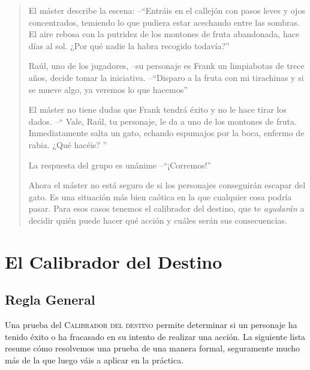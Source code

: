 \begin{quotation}

El máster describe la escena: --\enquote{Entráis en el callejón con pasos
 leves y ojos concentrados, temiendo lo que pudiera estar acechando entre 
 las sombras. El aire rebosa con la putridez de los montones de fruta abandonada, 
 hace días al sol. ¿Por qué nadie la habra recogido todavía?}

Raúl, uno de los jugadores, --su personaje es Frank un limpiabotas de trece años, 
decide tomar la iniciativa. --\enquote{Disparo a la fruta con mi tirachinas 
y si se mueve algo, ya veremos lo que hacemos}

El máster no tiene dudas que Frank tendrá éxito y no le hace tirar los dados. --\enquote{
Vale, Raúl, tu personaje, le da a uno de los montones de fruta. Inmediatamente
salta un gato, echando espumajos por la boca, enfermo de rabia. ¿Qué hacéis?
}

La respuesta del grupo es unánime --\enquote{¡Corremos!} 

Ahora el máster no está seguro de si los personajes conseguirán escapar del gato.
Es una situación más bien caótica en la que cualquier cosa podría pasar. Para esos
casos tenemos el calibrador del destino, que te \emph{ayudarán} a decidir quién puede 
hacer qué acción y cuáles serán sus consecuencias.

\end{quotation}

\section{El Calibrador del Destino}

\subsection{Regla General}

Una prueba del \textsc{Calibrador del destino} permite determinar si un personaje ha tenido éxito o ha fracasado en su intento de realizar una acción. La siguiente lista resume cómo resolvemos una prueba de una manera formal, seguramente mucho más de la que luego váis a aplicar en la práctica.

